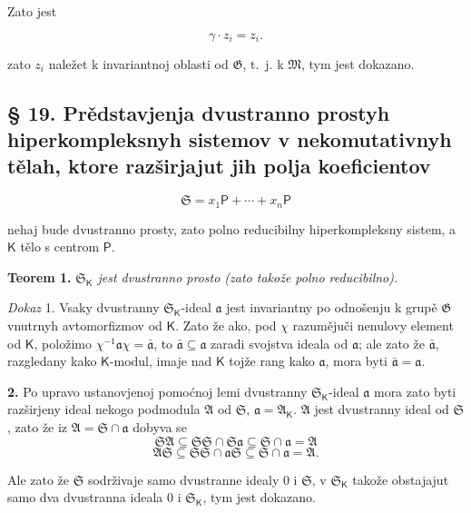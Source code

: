 \documentclass[11pt]{article}
\begin{document}
Zato jest

\[
\gamma\cdot z_i=z_i.
\]

zato \(z_i\) naležet k invariantnoj oblasti od \(\mathfrak G\), t.~j. k \(\mathfrak M\), tym jest dokazano.

\subsection*{§ 19. Prědstavjenja dvustranno prostyh hiperkompleksnyh sistemov v nekomutativnyh tělah, ktore razširjajut jih polja koeficientov}\label{darstellungen-zweiseitig-einfacher-hyperkomplexer-systeme-in-nichtkommutativen-erweiterungskoerpern-ihrer-koeffizientenkoerper}

\[
\mathfrak S=x_1\mathsf P+\cdots+x_n\mathsf P
\]

nehaj bude dvustranno prosty, zato polno reducibilny hiperkompleksny sistem, a \(\mathsf K\) tělo s centrom \(\mathsf P\).

\textbf{Teorem 1.} \emph{\(\mathfrak S_{\mathsf K}\) jest dvustranno prosto (zato takože polno reducibilno).}

\emph{Dokaz} 1. Vsaky dvustranny \(\mathfrak S_{\mathsf K}\)-ideal \(\mathfrak a\) jest invariantny po odnošenju k grupě \(\mathfrak G\) vnutrnyh avtomorfizmov od \(\mathsf K\). Zato že ako, pod \(\chi\) razumějuči nenulovy element od \(\mathsf K\), položimo \(\chi^{-1}\mathfrak a\chi=\bar{\mathfrak a}\), to \(\bar{\mathfrak a}\subseteq\mathfrak a\) zaradi svojstva ideala od \(\mathfrak a\); ale zato že \(\bar{\mathfrak a}\), razgledany kako \(\mathsf K\)-modul, imaje nad \(\mathsf K\) tojže rang kako \(\mathfrak a\), mora byti \(\bar{\mathfrak a}=\mathfrak a\).

\textbf{2.} Po upravo ustanovjenoj pomoćnoj lemi dvustranny \(\mathfrak S_{\mathsf K}\)-ideal \(\mathfrak a\) mora zato byti razširjeny ideal nekogo podmodula \(\mathfrak A\) od \(\mathfrak S\), \(\mathfrak a=\mathfrak A_{\mathsf K}\). \(\mathfrak A\) jest dvustranny ideal od \(\mathfrak S\), zato že iz \(\mathfrak A=\mathfrak S\cap\mathfrak a\) dobyva se
\[
\mathfrak S\mathfrak A\subseteq\mathfrak S\mathfrak S\cap\mathfrak S\mathfrak a\subseteq\mathfrak S\cap\mathfrak a=\mathfrak A
\]
\[
\mathfrak A\mathfrak S\subseteq\mathfrak S\mathfrak S\cap\mathfrak a\mathfrak S\subseteq\mathfrak S\cap\mathfrak a=\mathfrak A.
\]

Ale zato že \(\mathfrak S\) sodrživaje samo dvustranne idealy 0 i \(\mathfrak S\), v \(\mathfrak S_{\mathsf K}\) takože obstajajut samo dva dvustranna ideala 0 i \(\mathfrak S_{\mathsf K}\), tym jest dokazano.
\end{document}
